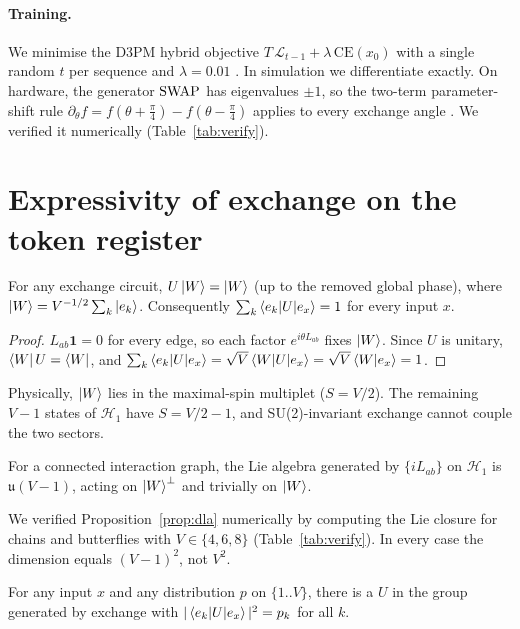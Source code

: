 \paragraph{Training.} We minimise the D3PM hybrid objective
$T\,\mathcal L_{t-1}+\lambda\,\mathrm{CE}(x_0)$ with a single random $t$ per sequence and $\lambda=0.01$
\citep{austin2021structured}. In simulation we differentiate exactly. On hardware, the generator
$\mathrm{SWAP}$ has eigenvalues $\pm1$, so the two-term parameter-shift rule
$\partial_\theta f=f(\theta+\tfrac\pi4)-f(\theta-\tfrac\pi4)$ applies to every exchange angle
\citep{mitarai2018quantum,schuld2019evaluating}. We verified it numerically (Table~\ref{tab:verify}).

\section{Expressivity of exchange on the token register}
\begin{proposition}\label{prop:dark}
For any exchange circuit, $U\ket W=\ket W$ (up to the removed global phase), where
$\ket W=V^{-1/2}\sum_k\ket{e_k}$. Consequently $\sum_k\braket{e_k|U|e_x}=1$ for every input $x$.
\end{proposition}
\begin{proof}
$L_{ab}\mathbf 1=0$ for every edge, so each factor $e^{i\theta L_{ab}}$ fixes $\ket W$. Since $U$ is
unitary, $\bra WU=\bra W$, and
$\sum_k\braket{e_k|U|e_x}=\sqrt V\braket{W|U|e_x}=\sqrt V\braket{W|e_x}=1$.
\end{proof}
Physically, $\ket W$ lies in the maximal-spin multiplet ($S=V/2$). The remaining $V\!-\!1$ states of
$\mathcal H_1$ have $S=V/2-1$, and SU(2)-invariant exchange cannot couple the two sectors.
\begin{proposition}\label{prop:dla}
For a connected interaction graph, the Lie algebra generated by $\{iL_{ab}\}$ on $\mathcal H_1$ is
$\mathfrak u(V\!-\!1)$, acting on $\ket W^\perp$ and trivially on $\ket W$.
\end{proposition}
We verified Proposition~\ref{prop:dla} numerically by computing the Lie closure for chains and butterflies
with $V\in\{4,6,8\}$ (Table~\ref{tab:verify}). In every case the dimension equals $(V-1)^2$, not $V^2$.
\begin{proposition}\label{prop:reach}
For any input $x$ and any distribution $p$ on $\{1..V\}$, there is a $U$ in the group generated by
exchange with $|\braket{e_k|U|e_x}|^2=p_k$ for all $k$.
\end{proposition}
